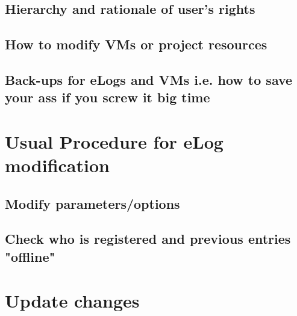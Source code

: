 \documentclass[runningheads,a4paper]{llncs}
\begin{document}
\subsection{Hierarchy and rationale of user's rights}
\subsection{How to modify VMs or project resources}
\subsection{Back-ups for eLogs and VMs i.e. how to save your ass if you screw it big time}

\section{Usual Procedure for eLog modification}

\subsection{Modify parameters/options}
\subsection{Check who is registered and previous entries "offline"}
\section{Update changes}


\nocite{*} 
\end{document}
